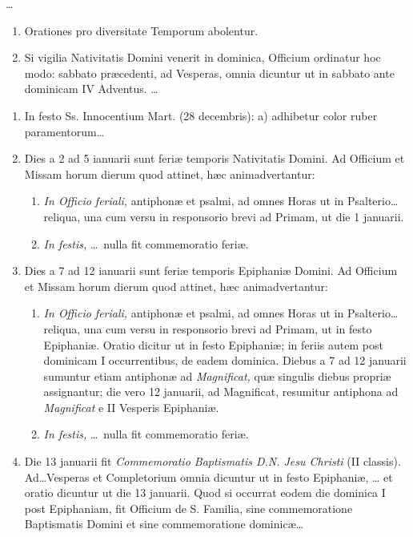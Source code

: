 \documentclass[vesperale_romanum.tex]{subfiles}
\begin{document}
…

\begin{enumerate}[nosep,start=18]
\item Orationes pro diversitate Temporum abolentur.
\item Si vigilia Nativitatis Domini venerit in dominica, Officium ordinatur hoc modo:  sabbato præcedenti, ad Vesperas, omnia dicuntur ut in sabbato ante dominicam IV Adventus. …
\end{enumerate}

\begin{enumerate}[nosep,start=21]
\item In festo Ss. Innocentium Mart. (28 decembris): a) adhibetur color ruber paramentorum…
\item Dies a 2 ad 5 ianuarii sunt feriæ temporis Nativitatis Domini. Ad Officium et Missam horum dierum quod attinet, hæc animadvertantur:
\begin{enumerate}[nosep,label=\alph*.]
\item \textit{In Officio feriali,} antiphonæ et psalmi, ad omnes Horas ut in Psalterio… reliqua, una cum versu in responsorio brevi ad Primam, ut die 1 januarii.
\item \textit{In festis,} … nulla fit commemoratio feriæ.
\end{enumerate}

 \item Dies a 7 ad 12 ianuarii sunt feriæ temporis Epiphaniæ Domini. Ad Officium et Missam horum dierum quod attinet, hæc animadvertantur:
 \begin{enumerate}[nosep,label=\alph*.]
 \item \textit{In Officio feriali,} antiphonæ et psalmi, ad omnes Horas ut in Psalterio… reliqua, una cum versu in responsorio brevi ad Primam, ut in festo Epiphaniæ. Oratio dicitur ut in festo Epiphaniæ; in feriis autem post dominicam I occurrentibus, de eadem dominica. Diebus a 7 ad 12 januarii sumuntur etiam antiphonæ ad \textit{Magnificat,} quæ singulis diebus propriæ assignantur; die vero 12 januarii, ad Magnificat, resumitur antiphona ad \textit{Magnificat} e II Vesperis Epiphaniæ.
 \item \textit{In festis,} … nulla fit commemoratio feriæ.
 \end{enumerate}
 
\item Die 13 januarii fit \textit{Commemoratio Baptismatis D.N. Jesu Christi} (II classis). Ad…Vesperas et Completorium omnia dicuntur ut in festo Epiphaniæ,  … et oratio dicuntur ut die 13 januarii. Quod si occurrat eodem die dominica I post Epiphaniam, fit Officium de S. Familia, sine commemoratione Baptismatis Domini et sine commemoratione dominicæ…
\end{enumerate}
\end{document}
